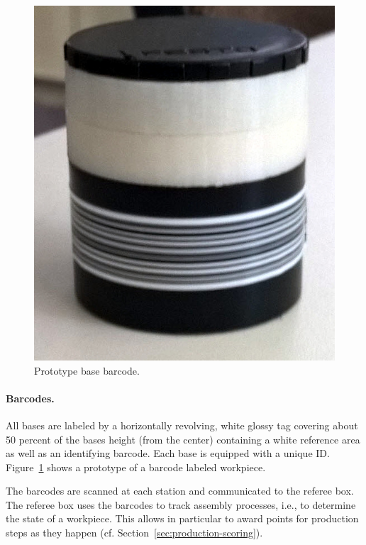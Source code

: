 \documentclass[12pt,twoside]{article}
\newcommand{\refsec}[1]{Section~\ref{#1}}
\newcommand{\reffig}[1]{Figure~\ref{#1}}
\begin{document}
\begin{figure}
  \centering
  \vspace{-2.7ex}
  \includegraphics[width=\linewidth]{figures/barcode-base}
  \caption{Prototype base barcode.}
  \label{fig:barcode}
\end{figure}
\paragraph{Barcodes.}
All bases are labeled by a horizontally revolving, white glossy tag
covering about 50 percent of the bases height (from the center)
containing a white reference area as well as an identifying
barcode. Each base is equipped with a unique ID\@. \reffig{fig:barcode}
shows a prototype of a barcode labeled workpiece.

The barcodes are scanned at each station and communicated to the
referee box. The referee box uses the barcodes to track assembly
processes, i.e., to determine the state of a workpiece. This allows in
particular to award points for production steps as they happen
(cf. \refsec{sec:production-scoring}).
\end{document}
